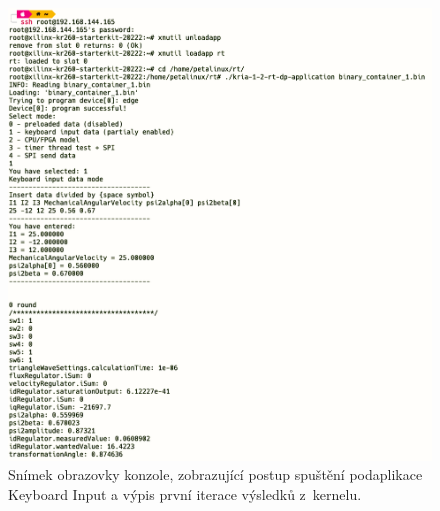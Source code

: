 \documentclass[a4paper, twoside, 11pt]{article}
\newcommand{\fbar}{\FloatBarrier}
\begin{document}
	\begin{figure}[htbp!]
		\centering
		\includegraphics[width=1\textwidth]{src/png/keyboard-input-terminal.png}
		\caption{Snímek obrazovky konzole, zobrazující postup spuštění podaplikace Keyboard Input a výpis první iterace výsledků z~kernelu.}
		\label{fig:keyboard-input-terminal}
	\end{figure}

		\fbar
\end{document}
